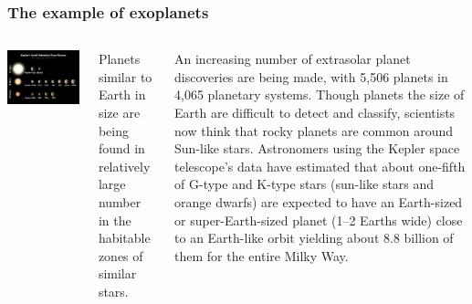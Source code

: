\begin{frame}
\frametitle{The example of exoplanets}

\begin{columns}

\includegraphics[scale=0.30]{exoplanets}

Planets similar to Earth in size are being found in relatively large number in the habitable zones of similar stars. 
 
 An increasing number of extrasolar planet discoveries are being made, with 5,506 planets in 4,065 planetary systems. Though planets the size of Earth are difficult to detect and classify, scientists now think that rocky planets are common around Sun-like stars. Astronomers using the Kepler space telescope's data have estimated that about one-fifth of G-type and K-type stars (sun-like stars and orange dwarfs) are expected to have an Earth-sized or super-Earth-sized planet (1--2 Earths wide) close to an Earth-like orbit yielding about 8.8 billion of them for the entire Milky Way.

 \end{columns}
\end{frame}

